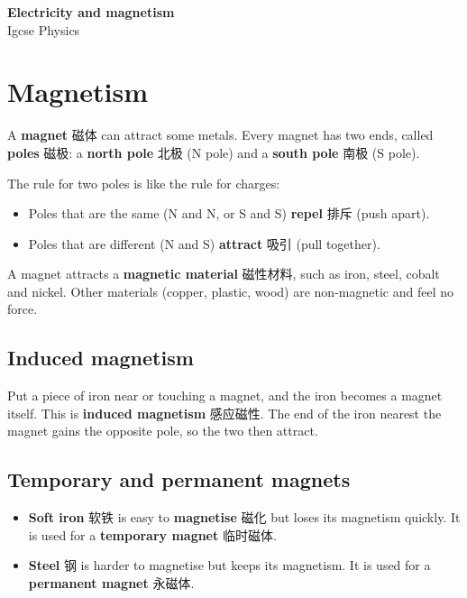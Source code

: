 \documentclass[11pt]{article}
\begin{document}
\begin{center}
  {\LARGE\bfseries Electricity and magnetism}\\[0.35em]
  {\large Igcse Physics}
\end{center}
\vspace{0.6em}

\section*{Magnetism}

A \textbf{magnet} 磁体 can attract some metals. Every magnet has two ends, called \textbf{poles} 磁极: a \textbf{north pole} 北极 (N pole) and a \textbf{south pole} 南极 (S pole).

The rule for two poles is like the rule for charges:

\begin{itemize}
\item Poles that are the same (N and N, or S and S) \textbf{repel} 排斥 (push apart).

\item Poles that are different (N and S) \textbf{attract} 吸引 (pull together).

\end{itemize}

A magnet attracts a \textbf{magnetic material} 磁性材料, such as iron, steel, cobalt and nickel. Other materials (copper, plastic, wood) are non-magnetic and feel no force.

\subsection*{Induced magnetism}

Put a piece of iron near or touching a magnet, and the iron becomes a magnet itself. This is \textbf{induced magnetism} 感应磁性. The end of the iron nearest the magnet gains the opposite pole, so the two then attract.

\subsection*{Temporary and permanent magnets}

\begin{itemize}
\item \textbf{Soft iron} 软铁 is easy to \textbf{magnetise} 磁化 but loses its magnetism quickly. It is used for a \textbf{temporary magnet} 临时磁体.

\item \textbf{Steel} 钢 is harder to magnetise but keeps its magnetism. It is used for a \textbf{permanent magnet} 永磁体.

\end{itemize}
\end{document}
